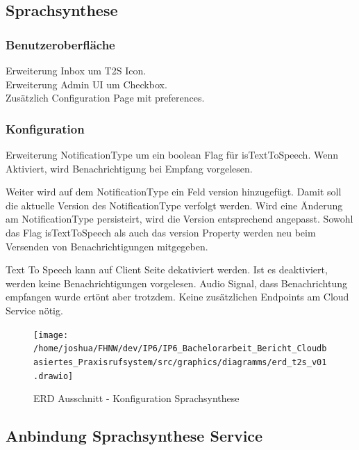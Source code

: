\subsection{Sprachsynthese}

\subsubsection*{Benutzeroberfläche}

Erweiterung Inbox um T2S Icon. \\
Erweiterung Admin UI um Checkbox. \\
Zusätzlich Configuration Page mit preferences. \\

\subsubsection*{Konfiguration}

Erweiterung NotificationType um ein boolean Flag für isTextToSpeech.
Wenn Aktiviert, wird Benachrichtigung bei Empfang vorgelesen.

Weiter wird auf dem NotificationType ein Feld version hinzugefügt.
Damit soll die aktuelle Version des NotificationType verfolgt werden.
Wird eine Änderung am NotificationType persisteirt, wird die Version entsprechend angepasst.
Sowohl das Flag isTextToSpeech als auch das version Property werden neu beim Versenden von Benachrichtigungen mitgegeben.

Text To Speech kann auf Client Seite dekativiert werden.
Ist es deaktiviert, werden keine Benachrichtigungen vorgelesen.
Audio Signal, dass Benachrichtung empfangen wurde ertönt aber trotzdem.
Keine zusätzlichen Endpoints am Cloud Service nötig. \\

\begin{figure}[h]
    \centering
    \begin{minipage}[b]{0.75\textwidth}
        \texttt{[image: /home/joshua/FHNW/dev/IP6/IP6\_Bachelorarbeit\_Bericht\_Cloudbasiertes\_Praxisrufsystem/src/graphics/diagramms/erd\_t2s\_v01.drawio]}
        \caption{ERD Ausschnitt - Konfiguration Sprachsynthese}
    \end{minipage}
\end{figure}

\clearpage

\subsection*{Anbindung Sprachsynthese Service}

